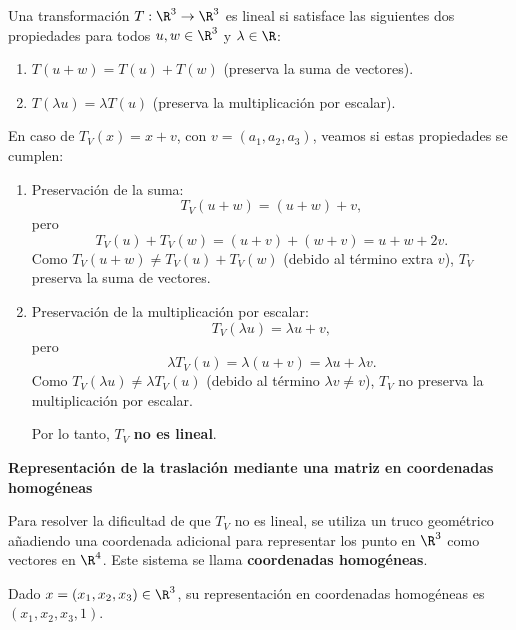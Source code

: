 \begin{enumerate}[label=\color{red}\textbf{\arabic*)}]
    Una transformación $T:\R^3\to \R^3$ es lineal si satisface las siguientes dos propiedades para todos $u,w\in \R^3$ y $\lambda\in \R$:
    \begin{enumerate}[label=\arabic*)]
        \item $T(u+w)=T(u)+T(w)$ (preserva la suma de vectores).
        \item  $T(\lambda u)=\lambda T(u)$ (preserva la multiplicación por escalar).
    \end{enumerate}
    En caso de $T_V(x)=x+v$, con  $v=(a_1,a_2,a_3)$, veamos si estas propiedades se cumplen: 
    \begin{enumerate}[label=\arabic*)]
        \item Preservación de la suma: \[
        T_V(u+w)=(u+w)+v,
        \] pero \[
        T_V(u)+T_V(w)=(u+v)+(w+v)=u+w+2v.
        \] 
        Como $T_V(u+w)\neq T_V(u)+T_V(w)$ (debido al término extra $v$), $T_V$ preserva la suma de vectores.
    \item Preservación de la multiplicación por escalar:  \[
    T_V(\lambda u)=\lambda u+v,
    \] pero \[
    \lambda T_V(u)=\lambda(u+v)=\lambda u+\lambda v.
    \] 
    Como $T_V(\lambda u)\neq \lambda T_V(u)$ (debido al término $\lambda v\neq v$), $T_V$ no preserva la multiplicación por escalar.

    Por lo tanto,  $T_V$  \textbf{no es lineal}.

    \end{enumerate}
    \textbf{Representación de la traslación mediante una matriz en coordenadas homogéneas}

    Para resolver la dificultad de que $T_V$ no es lineal, se utiliza un truco geométrico añadiendo una coordenada adicional para representar los punto en  $\R^3$ como vectores en $\R^4$. Este sistema se llama \textbf{coordenadas homogéneas}.

    Dado $x=(x_1,x_2,x_3)\in \R^3$, su representación en coordenadas homogéneas es $(x_1,x_2,x_3,1)$. 


\end{enumerate}
